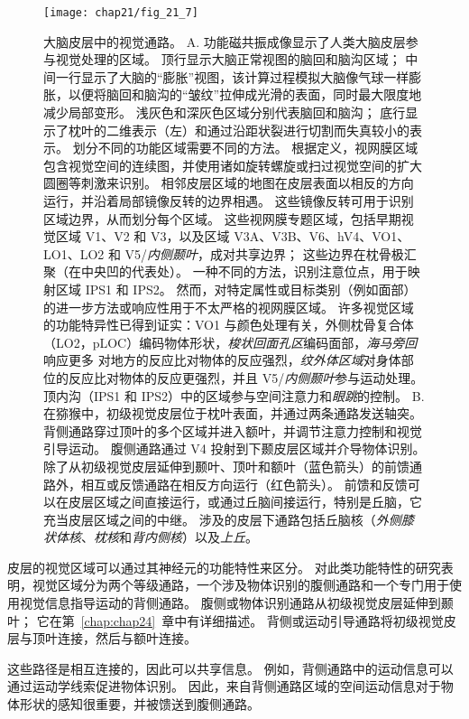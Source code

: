 \begin{figure}[htbp]
	\centering
	\texttt{[image: chap21/fig\_21\_7]}
	\caption{大脑皮层中的视觉通路。
		A. 功能磁共振成像显示了人类大脑皮层参与视觉处理的区域。
		顶行显示大脑正常视图的脑回和脑沟区域；
		中间一行显示了大脑的“膨胀”视图，该计算过程模拟大脑像气球一样膨胀，以便将脑回和脑沟的“皱纹”拉伸成光滑的表面，同时最大限度地减少局部变形。
		浅灰色和深灰色区域分别代表脑回和脑沟； 底行显示了枕叶的二维表示（左）和通过沿距状裂进行切割而失真较小的表示。
		划分不同的功能区域需要不同的方法。
		根据定义，视网膜区域包含视觉空间的连续图，并使用诸如旋转螺旋或扫过视觉空间的扩大圆圈等刺激来识别。
		相邻皮层区域的地图在皮层表面以相反的方向运行，并沿着局部镜像反转的边界相遇。
		这些镜像反转可用于识别区域边界，从而划分每个区域。
		这些视网膜专题区域，包括早期视觉区域 V1、V2 和 V3，以及区域 V3A、V3B、V6、hV4、VO1、LO1、LO2 和 V5/\textit{内侧颞叶}，成对共享边界； 这些边界在枕骨极汇聚（在中央凹的代表处）。
		一种不同的方法，识别注意位点，用于映射区域 IPS1 和 IPS2。
		然而，对特定属性或目标类别（例如面部）的进一步方法或响应性用于不太严格的视网膜区域。
		许多视觉区域的功能特异性已得到证实：VO1 与颜色处理有关，外侧枕骨复合体（LO2，pLOC）编码物体形状，\textit{梭状回面孔区}编码面部，\textit{海马旁回}响应更多 对地方的反应比对物体的反应强烈，\textit{纹外体区域}对身体部位的反应比对物体的反应更强烈，并且 V5/\textit{内侧颞叶}参与运动处理。
		顶内沟（IPS1 和 IPS2）中的区域参与空间注意力和\textit{眼跳}的控制。
		B. 在猕猴中，初级视觉皮层位于枕叶表面，并通过两条通路发送轴突。
		背侧通路穿过顶叶的多个区域并进入额叶，并调节注意力控制和视觉引导运动。
		腹侧通路通过 V4 投射到下颞皮层区域并介导物体识别。
		除了从初级视觉皮层延伸到颞叶、顶叶和额叶（蓝色箭头）的前馈通路外，相互或反馈通路在相反方向运行（红色箭头）。
		前馈和反馈可以在皮层区域之间直接运行，或通过丘脑间接运行，特别是丘脑，它充当皮层区域之间的中继。 
		涉及的皮层下通路包括丘脑核（\textit{外侧膝状体核}、\textit{枕核}和\textit{背内侧核}）以及\textit{上丘}。}
	\label{fig:21_7}
\end{figure}


皮层的视觉区域可以通过其神经元的功能特性来区分。
对此类功能特性的研究表明，视觉区域分为两个等级通路，一个涉及物体识别的腹侧通路和一个专门用于使用视觉信息指导运动的背侧通路。
腹侧或物体识别通路从初级视觉皮层延伸到颞叶；
它在第~\ref{chap:chap24}~章中有详细描述。
背侧或运动引导通路将初级视觉皮层与顶叶连接，然后与额叶连接。


这些路径是相互连接的，因此可以共享信息。
例如，背侧通路中的运动信息可以通过运动学线索促进物体识别。
因此，来自背侧通路区域的空间运动信息对于物体形状的感知很重要，并被馈送到腹侧通路。


